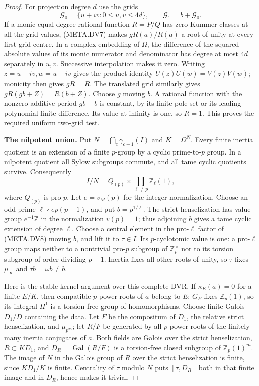 \begin{proof}
For projection degree $d$ use the grids
\[
       \mathcal G_0=\{u+iv:0\le u,v\le4d\},
                         \qquad \mathcal G_1=b+\mathcal G_0.
\]
If a monic equal-degree rational function $R=P/Q$
has zero Kummer classes at all the grid values,
(META.DV7) makes $gR(a)/R(a)$ a root of unity at
every first-grid centre.
In a complex embedding of $\Omega$, the difference
of the squared absolute values of its monic
numerator and denominator has degree at most $4d$
separately in $u,v$.
Successive interpolation makes it zero.
Writing $z=u+iv,w=u-iv$ gives the product identity
$U(z)\overline U(w)=V(z)\overline V(w)$; monicity
then gives $gR=R$.
The translated grid similarly gives
$gR(gb+Z)=R(b+Z)$.
Choose $g$ moving $b$.
A rational function with the nonzero additive
period $gb-b$ is constant, by its finite pole set
or its leading polynomial finite difference.
Its value at infinity is one, so $R=1$.
This proves the required uniform two-grid test.

\medskip\noindent\textbf{The nilpotent union.}
Put $N=\bigcap_c\gamma_{c+1}(I)$ and $K=\Omega^N$.
Every finite inertia quotient is an extension of
a finite $p$-group by a cyclic prime-to-$p$ group.
In a nilpotent quotient all Sylow subgroups commute,
and all tame cyclic quotients survive.
Consequently
\[
       I/N=Q_{(p)}\times\prod_{\ell\ne p}\mathbb Z_\ell(1),
                                                               \tag{META.DV8}
\]
where $Q_{(p)}$ is pro-$p$.
Let $e=v_M(p)$ for the integer normalization.
Choose an odd prime $\ell\nmid ep(p-1)$, and put
$b=p^{1/\ell}$.
The strict henselization has value group
$e^{-1}\mathbb Z$ in the normalization $v(p)=1$;
thus adjoining $b$ gives a tame cyclic extension
of degree $\ell$.
Choose a central element in the pro-$\ell$ factor
of (META.DV8) moving $b$, and lift it to $\tau\in I$.
Its $p$-cyclotomic value is one: a pro-$\ell$ group
maps neither to a nontrivial pro-$p$ subgroup of
$\mathbb Z_p^\times$ nor to its torsion subgroup
of order dividing $p-1$.
Inertia fixes all other roots of unity, so $\tau$
fixes $\mu_\infty$ and $\tau b=\omega b\ne b$.

Here is the stable-kernel argument over this
complete DVR.
If $\kappa_E(a)=0$ for a finite $E/K$, then
compatible $p$-power roots of $a$ belong to $E$:
$G_E$ fixes $\mathbb Z_p(1)$, so its integral
$H^1$ is a torsion-free group of homomorphisms.
Choose finite Galois $D_1/D$ containing the data.
Let $F$ be the compositum of $D_1$, the relative
strict henselization, and $\mu_{p^\infty}$;
let $R/F$ be generated by all $p$-power roots of
the finitely many inertia conjugates of $a$.
Both fields are Galois over the strict henselization,
$R\subset KD_1$, and
$D_R=\operatorname{Gal}(R/F)$ is a torsion-free
closed subgroup of $\mathbb Z_p(1)^m$.
The image of $N$ in the Galois group of $R$
over the strict henselization is finite, since
$KD_1/K$ is finite.
Centrality of $\tau$ modulo $N$ puts
$[\tau,D_R]$ both in that finite image and in
$D_R$, hence makes it trivial.


\end{proof}
